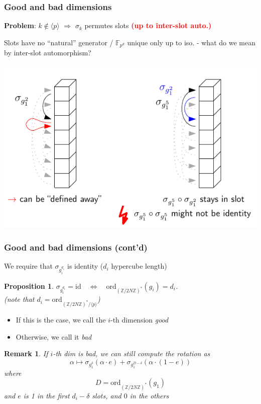 \documentclass{beamer}
\newcommand{\Z}{\mathbb{Z}}
\newcommand{\F}{\mathbb{F}}
\newtheorem{remark}{Remark}
\newtheorem{prop}{Proposition}
\begin{document}
\begin{frame}
    \frametitle{Good and bad dimensions}

    \textbf{Problem}: $k \notin \langle p \rangle$ $\Rightarrow$ $\sigma_k$ permutes slots \textcolor{red}{\textbf{(up to inter-slot auto.)}}
    \begin{center}
        Slots have no ``natural'' generator / $\F_{p^d}$ unique only up to iso. - what do we mean by inter-slot automorphism?
    \end{center}
    \begin{center}
        \includegraphics{interslot_auto.pdf}
    \end{center}
\end{frame}

\begin{frame}
    \frametitle{Good and bad dimensions (cont'd)}

    We require that $\sigma_{g_i^{d_i}}$ is identity ($d_i$ hypercube length)
    \begin{prop}
        $\sigma_{g_i^{d_i}} = \mathrm{id} \quad \Leftrightarrow \quad \mathrm{ord}_{(\Z/2N\Z)^*}(g_i) = d_i$.
        \\(note that $d_i = \mathrm{ord}_{(\Z/2N\Z)^*/\langle p \rangle}$)
    \end{prop}
    \begin{itemize}
        \item If this is the case, we call the $i$-th dimension \emph{good}
        \item Otherwise, we call it \emph{bad}
    \end{itemize}
    \begin{remark}
        If $i$-th dim is bad, we can still compute the rotation as
        \begin{equation*}
            \alpha \mapsto \sigma_{g_1^\delta}(\alpha \cdot e) + \sigma_{g_1^{D - \delta}}(\alpha \cdot (1 - e))
        \end{equation*}
        where
        \begin{equation*}
            D = \mathrm{ord}_{(\Z/2N\Z)^*}(g_1)
        \end{equation*}
        and $e$ is 1 in the first $d_i - \delta$ slots, and $0$ in the others
    \end{remark}
\end{frame}
\end{document}
